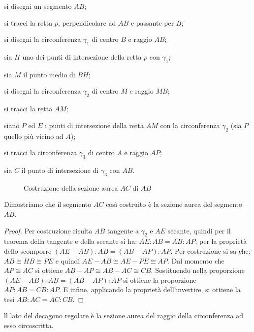 \begin{enumerate*}
\item si disegni un segmento \(AB\);
\item si tracci la retta \(p\), perpendicolare ad \(AB\) e passante per 
\(B\);
\item si disegni la circonferenza \(\gamma_1\) di centro \(B\) e raggio 
\(AB\);
\item sia \(H\) uno dei punti di intersezione della retta \(p\) con 
\(\gamma_1\);
\item sia \(M\) il punto medio di \(BH\);
\item si disegni la circonferenza \(\gamma_2\) di centro \(M\) e raggio 
\(MB\);
\item si tracci la retta \(AM\);
\item siano \(P\) ed \(E\) i punti di intersezione della retta \(AM\) con 
la circonferenza \(\gamma_2\) (sia \(P\) quello più vicino ad \(A\));
\item si tracci la circonferenza \(\gamma_3\) di centro \(A\) e raggio 
\(AP\);
\item sia \(C\) il punto di intersezione di \(\gamma_3\) con \(AB\).
\end{enumerate*}


\begin{inaccessibleblock}
 \begin{figure}[!htb]
	\centering
	\caption{Costruzione della sezione aurea \(AC\) di 
\(AB\)}\label{fig:sez_aurea2}
\end{figure}
\end{inaccessibleblock}

Dimostriamo che il segmento \(AC\) così costruito è la sezione aurea 
del segmento \(AB\).
\begin{proof}
Per costruzione risulta \(AB\) tangente a \(\gamma_2\) e \(AE\) secante, 
quindi per il teorema della tangente e della secante si ha: \(AE : AB 
= AB : AP\); per la proprietà dello scomporre \((AE-AB):AB=(AB-AP):AP\).
Per costruzione si sa che: \(AB\cong HB\cong PE\) e quindi \(AE - AB 
\cong AE - PE\cong AP\).
Dal momento che \(AP\cong AC\) si ottiene \(AB - AP \cong AB - AC \cong 
CB\).
Sostituendo nella proporzione \((AE-AB):AB=(AB-AP):AP\) si ottiene la 
proporzione \(AP : AB = CB : AP\).
E infine, applicando la proprietà dell'invertire, si ottiene la tesi 
\(AB : AC = AC : CB\).
\end{proof}

\begin{teorema}
ll lato del decagono regolare è la sezione aurea del raggio della 
circonferenza ad esso circoscritta.
\end{teorema}


